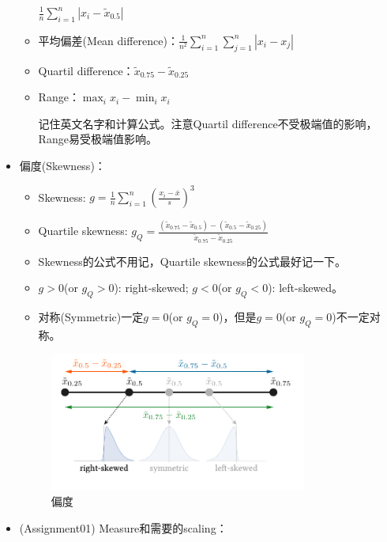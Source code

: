 \documentclass[12pt, a4paper, oneside]{ctexart}
\begin{document}
\begin{itemize}
\begin{itemize}
        $\frac{1}{n}\sum_{i=1}^{n}|x_i-\widetilde{x}_{0.5}|$
        \item 平均偏差(Mean difference)：$\frac{1}{n^2}\sum_{i=1}^{n}\sum_{j=1}^{n}|x_i-x_j|$
        \item Quartil difference：$\widetilde{x}_{0.75}-\widetilde{x}_{0.25}$
        \item Range：$\max_i x_i - \min_i x_i$
        
        \begin{tcolorbox}
            记住英文名字和计算公式。注意Quartil difference不受极端值的影响，Range易受极端值影响。
        \end{tcolorbox}
    \end{itemize}
    \item 偏度(Skewness)：
    \begin{itemize}
        \item Skewness: $g=\frac{1}{n}\sum_{i=1}^n{(\frac{x_i-\overline{x} }{s})}^3$
        \item Quartile skewness: $g_Q=\frac{(\widetilde{x}_{0.75}-\widetilde{x}_{0.5} )-(\widetilde{x}_{0.5}-\widetilde{x}_{0.25})}{\widetilde{x}_{0.75}-\widetilde{x}_{0.25}}$
    \end{itemize}
    \begin{tcolorbox}
        \begin{itemize}
            \item Skewness的公式不用记，Quartile skewness的公式最好记一下。
            \item $g>0$(or $g_Q>0$): right-skewed; $g<0$(or $g_Q<0$): left-skewed。
            \item 对称(Symmetric)一定$g=0$(or $g_Q=0$)，但是$g=0$(or $g_Q=0$)不一定对称。
        \end{itemize}
    \end{tcolorbox}
    \begin{figure}[htbp]
        \centering
        \includegraphics[width=0.8\textwidth]{skewness.png}
        \caption{偏度}
    \end{figure}
    \newpage
    \item (Assignment01) Measure和需要的scaling：
    

\end{itemize}
\end{document}
